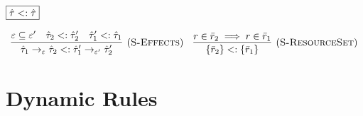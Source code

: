\documentclass{llncs}
\begin{document}
\noindent
$\fbox{$\hat \tau <: \hat \tau$}$

\[
\begin{array}{c}

\infer[(\textsc{S-Effects})]
	{\hat \tau_1 \rightarrow_{\varepsilon} \hat \tau_2 <: \hat \tau_1' \rightarrow_{\varepsilon'} \hat \tau_2'}
	{\varepsilon \subseteq \varepsilon' & \hat \tau_2 <: \hat \tau_2' & \hat \tau_1' <: \hat \tau_1}
~~~
\infer[(\textsc{S-ResourceSet})]
	{\{ \bar r_2 \} <: \{ \bar r_1 \}}
	{r \in \bar r_2 \implies r \in \bar r_1}


\end{array}
\]

\section{Dynamic Rules}

\noindent
{}
\end{document}
